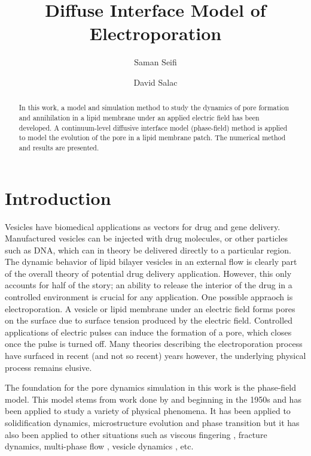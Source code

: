 \documentclass[english,12pt]{article}
\begin{document}
\title{Diffuse Interface Model of Electroporation}

\author{Saman Seifi}
\author{David Salac}

\date{}

\maketitle

\begin{abstract}
In this work, a model and simulation method to study the dynamics of pore formation and annihilation in a lipid membrane under an applied electric field has been developed. A continuum-level diffusive interface model (phase-field) method is applied to model the evolution of the pore in a lipid membrane patch. The numerical method and results are presented.	
\end{abstract}


\section{Introduction}

Vesicles have biomedical applications as vectors for drug and gene delivery. Manufactured vesicles can be injected with drug molecules, or other particles such as DNA, which can in theory be delivered directly to a particular region.
    The dynamic behavior of lipid bilayer vesicles in an external flow is clearly part of the overall theory of potential drug delivery application.
However, this only accounts for half of the story; an ability to release the interior
of the drug in a controlled environment is crucial for any application. 
     One possible appraoch is electroporation. A vesicle or lipid membrane under an electric field forms pores on the surface due to surface tension produced by the electric field. Controlled applications of electric pulses can induce the formation of a pore, which closes once the pulse is turned off.
     Many theories describing the electroporation process have surfaced in recent (and not so recent) years \citep{Weaver1996135,Zimmermann1974881,DeBruin19991213} however, the underlying physical process remains elusive.
     
The foundation for the pore dynamics simulation in this work is the phase-field model. This model stems from work done by \citep{landau1950theory,Cahn1971151} and \citep{Allen19791085} beginning in the 1950s and has been applied to study a variety of physical phenomena. It has been applied to solidification dynamics, microstructure evolution and phase transition but it has also been applied to other situations such as viscous fingering \citep{PhysRevE.61.6632,PhysRevE.68.046310}, fracture dynamics,\cite{PhysRevLett.87.045501} multi-phase flow \cite{Steinbach1996135,Badalassi2003371}, vesicle dynamics \cite{Du2004450,elliott2010surface,lowengrub2009phase}, etc.
\end{document}
